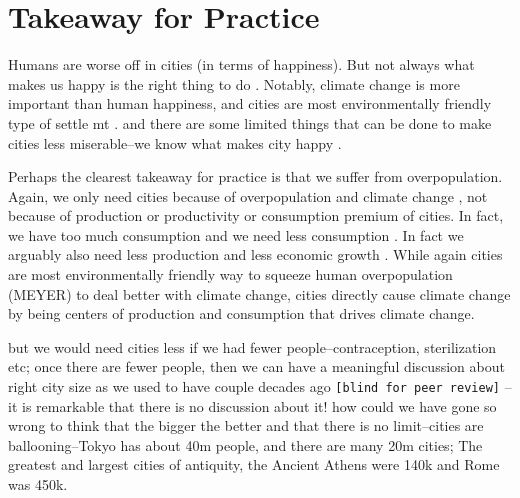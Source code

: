 \documentclass[10pt, letterpaper]{article}
\begin{document}
\section{Takeaway for Practice}
Humans are worse off in cities (in terms of happiness). But not always what
makes us happy is the right thing to do \citep{linden11,haybron08,nussbaum05}. Notably,
climate change is more important than human happiness, and cities are most
environmentally friendly type of settle mt \citep{meyer13}. and there are some limited
things that can be done to make cities less miserable--we know what makes city
happy \citep{ballas13}.

Perhaps the clearest takeaway for practice is that we suffer from overpopulation.
Again, we only need cities because of overpopulation and climate change \citep{pachauri14}, not
because of production or productivity or consumption premium of cities. In fact,
we have too much consumption and we need less consumption
\cite{dittmar14,kasser13,leonard10}. In fact we arguably also need less
production and less economic growth \cite{kallis12,kallis11,bergh11}. While
again cities are most environmentally friendly way to squeeze human
overpopulation (MEYER) to deal better with climate change, cities directly cause
climate change by being centers of production and consumption that drives
climate change. 

but we would need cities less if we had fewer people--contraception,
sterilization etc; once there are fewer people, then we can have a meaningful
discussion about right city size as we used to have couple decades ago
\texttt{[blind for peer review]} %
--it is remarkable that there is
no discussion about it! how could we have gone so wrong to think that the bigger
the better and that there is no limit--cities are ballooning--Tokyo has about 40m
people, and there are many 20m cities; The greatest and largest cities of
antiquity, the Ancient Athens were 140k and Rome was 450k. 

\end{document}
